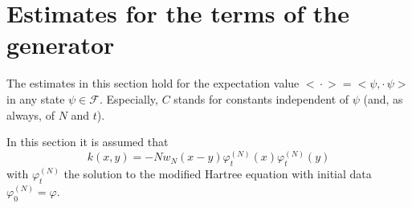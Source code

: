 \documentclass[11pt,a4paper,DIV11]{scrartcl}	%
\newcommand{\fock}{\mathcal{F}}		%
\newcommand{\scal}[2]{\big<#1,#2\big>} %
\newcommand{\ev}[1]{\big<#1\big>}	%
\newcommand{\ph}{\varphi_t^{(N)}}	%
\begin{document}

\appendix
\section{Estimates for the terms of the generator}
\label{ch:generatorestimates}
\label{s:generatorestimates}
The estimates in this section hold for the expectation value $\ev{\cdot} = \scal{\psi}{\cdot\,\psi}$ in any state $\psi \in \fock$. Especially, $C$ stands for constants independent of $\psi$ (and, as always, of $N$ and $t$).

In this section it is assumed that
\[k(x,y) = - N w_N(x-y)\ph(x)\ph(y)\]
with $\ph$ the solution to the modified Hartree equation with initial data $\varphi^{(N)}_0 = \varphi$.
\end{document}
